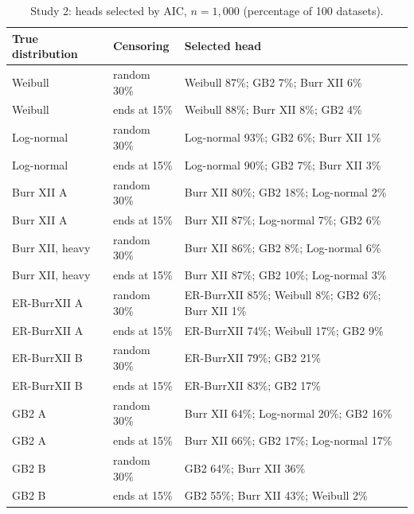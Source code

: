 \begin{table}[htbp]
\centering
\caption{Study 2: heads selected by AIC, $n = 1{,}000$ (percentage of 100 datasets).}\label{stab:aic}
\small
\begin{tabular}{llp{9cm}}
\toprule
True distribution & Censoring & Selected head \\
\midrule
Weibull & random 30\% & Weibull 87\%; GB2 7\%; Burr XII 6\% \\
Weibull & ends at 15\% & Weibull 88\%; Burr XII 8\%; GB2 4\% \\
Log-normal & random 30\% & Log-normal 93\%; GB2 6\%; Burr XII 1\% \\
Log-normal & ends at 15\% & Log-normal 90\%; GB2 7\%; Burr XII 3\% \\
Burr XII A & random 30\% & Burr XII 80\%; GB2 18\%; Log-normal 2\% \\
Burr XII A & ends at 15\% & Burr XII 87\%; Log-normal 7\%; GB2 6\% \\
Burr XII, heavy & random 30\% & Burr XII 86\%; GB2 8\%; Log-normal 6\% \\
Burr XII, heavy & ends at 15\% & Burr XII 87\%; GB2 10\%; Log-normal 3\% \\
ER-BurrXII A & random 30\% & ER-BurrXII 85\%; Weibull 8\%; GB2 6\%; Burr XII 1\% \\
ER-BurrXII A & ends at 15\% & ER-BurrXII 74\%; Weibull 17\%; GB2 9\% \\
ER-BurrXII B & random 30\% & ER-BurrXII 79\%; GB2 21\% \\
ER-BurrXII B & ends at 15\% & ER-BurrXII 83\%; GB2 17\% \\
GB2 A & random 30\% & Burr XII 64\%; Log-normal 20\%; GB2 16\% \\
GB2 A & ends at 15\% & Burr XII 66\%; GB2 17\%; Log-normal 17\% \\
GB2 B & random 30\% & GB2 64\%; Burr XII 36\% \\
GB2 B & ends at 15\% & GB2 55\%; Burr XII 43\%; Weibull 2\% \\
\bottomrule
\end{tabular}
\end{table}
